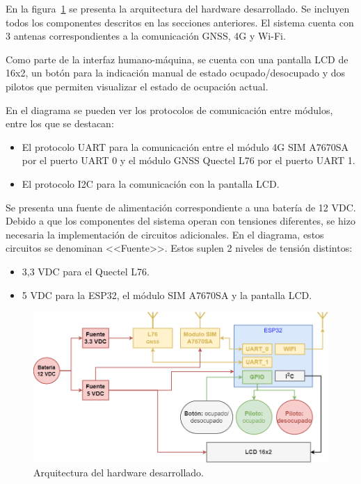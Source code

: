 En la figura~\ref{fig:Arq_harware} se presenta la arquitectura del hardware desarrollado. Se incluyen todos los componentes descritos en las secciones anteriores. El sistema cuenta con 3 antenas correspondientes a la comunicación GNSS, 4G y Wi-Fi. 

Como parte de la interfaz humano-máquina, se cuenta con una pantalla LCD de 16x2, un botón para la indicación manual de estado ocupado/desocupado y dos pilotos que permiten visualizar el estado de ocupación actual. 

En el diagrama se pueden ver los protocolos de comunicación entre módulos, entre los que se destacan:

\begin{itemize}
    \item El protocolo UART para la comunicación entre el módulo 4G SIM A7670SA por el puerto UART 0 y el módulo  GNSS Quectel L76 por el puerto UART 1. 
    \item El protocolo I2C para la comunicación con la pantalla LCD. 
\end{itemize}

Se presenta una fuente de alimentación correspondiente a una batería de 12 VDC. Debido a que los componentes del sistema operan con tensiones diferentes, se hizo necesaria la implementación de circuitos adicionales. En el diagrama, estos circuitos se denominan <<Fuente>>. Estos suplen 2 niveles de tensión distintos: 

\begin{itemize}
    \item 3,3 VDC para el Quectel L76.
    \item 5 VDC para la ESP32, el módulo SIM A7670SA y la pantalla LCD.
\end{itemize}

\begin{figure}[htbp]
	\centering
	\includegraphics[width=1\textwidth]{./Figures/arquitectura_hardware_sistema.png}
	\caption{Arquitectura del hardware desarrollado.}
	\label{fig:Arq_harware}
\end{figure}



